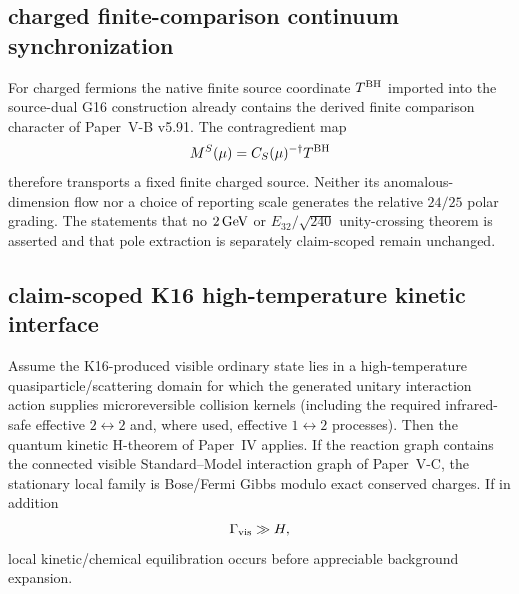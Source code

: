 \documentclass[12pt,a4paper]{article}
\begin{document}



\subsection{charged finite-comparison continuum synchronization}
\label{p12:sec:v295-charged-comparison-continuum-sync}
For charged fermions the native finite source coordinate $T^{\rm BH}$ imported
into the source-dual G16 construction already contains the derived finite
comparison character of Paper~V-B v5.91.  The contragredient map
\[
 M^S(\mu)=C_S(\mu)^{-\dagger}T^{\rm BH}
\]
therefore transports a fixed finite charged source.  Neither its anomalous-
dimension flow nor a choice of reporting scale generates the relative
$24/25$ polar grading.  The statements that no $2\,{\rm GeV}$ or
$E_{32}/\sqrt{240}$ unity-crossing theorem is asserted and that pole extraction
is separately claim-scoped remain unchanged.





\subsection{claim-scoped K16 high-temperature kinetic interface}
\label{p12:sec:v296-k16-kinetic-interface}

\begin{theorem}
\label{p12:thm:v296-k16-local-kinetic}
Assume the K16-produced visible ordinary state lies in a high-temperature
quasiparticle/scattering domain for which the generated unitary interaction
action supplies microreversible collision kernels (including the required
infrared-safe effective $2\leftrightarrow2$ and, where used, effective
$1\leftrightarrow2$ processes).  Then the quantum kinetic H-theorem of
Paper~IV applies.  If the reaction graph contains the connected visible
Standard--Model interaction graph of Paper~V-C, the stationary local family is
Bose/Fermi Gibbs modulo exact conserved charges.  If in addition
\[
 \Gamma_{\rm vis}\gg H,
\]
local kinetic/chemical equilibration occurs before appreciable background
expansion.
\end{theorem}
\end{document}
